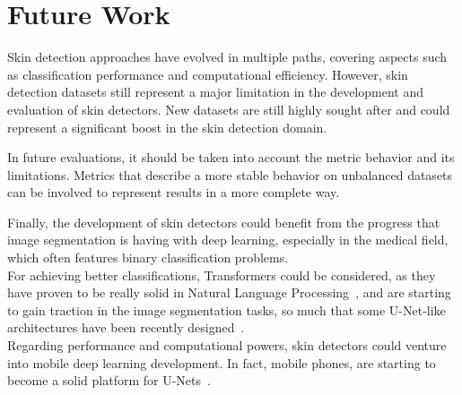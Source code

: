 \section{Future Work}

Skin detection approaches have evolved in multiple paths, covering aspects such as classification performance and computational efficiency.
However, skin detection datasets still represent a major limitation in the development and evaluation of skin detectors.
New datasets are still highly sought after and could represent a significant boost in the skin detection domain.

In future evaluations, it should be taken into account the metric behavior and its limitations.
Metrics that describe a more stable behavior on unbalanced datasets can be involved to represent results in a more complete way.

Finally, the development of skin detectors could benefit from the progress that image segmentation is having with deep learning, especially in the medical field, which often features binary classification problems.\\
For achieving better classifications, Transformers could be considered, as they have proven to be really solid in Natural Language Processing~\cite{vaswani2017attention}, and are starting to gain traction in the image segmentation tasks, so much that some U-Net-like architectures have been recently designed~\cite{cao2021swin, chen2021transunet}.\\
Regarding performance and computational powers, skin detectors could venture into mobile deep learning development.
In fact, mobile phones, are starting to become a solid platform for U-Nets~\cite{ignatov2021fast}.

